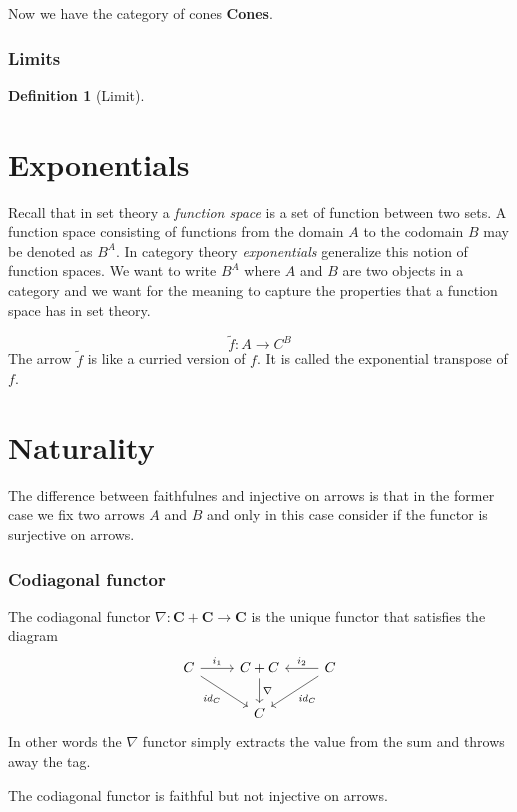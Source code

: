 \documentclass{book}
\theoremstyle{definition}
\newtheorem{definition}{Definition}[section]
\newcommand\id{\mathit{id}}
\begin{document}
Now we have the category of cones \textbf{Cones}.

\subsection{Limits}

\begin{definition}[Limit]
\end{definition}

\chapter{Exponentials}

Recall that in set theory a \emph{function space} is a set of function between
two sets. A function space consisting of functions from the domain $A$ to the
codomain $B$ may be denoted as $B^{A}$. In category theory \emph{exponentials}
generalize this notion of function spaces. We want to write $B^{A}$ where $A$
and $B$ are two objects in a category and we want for the meaning to capture the
properties that a function space has in set theory.

\[
  \tilde{f} : A \to C^{B}
\]
The arrow $\tilde{f}$ is like a curried version of $f$. It is called the
exponential transpose of $f$.

\chapter{Naturality}

The difference between faithfulnes and injective on arrows is that in the former
case we fix two arrows $A$ and $B$ and only in this case consider if the functor
is surjective on arrows.

\subsection{Codiagonal functor}

The codiagonal functor $\nabla : \mathbf{C} + \mathbf{C} \to \mathbf{C}$ is the unique
functor that satisfies the diagram
\[
  \begin{tikzcd}
    C \ar[r, "i_{1}"] \ar[dr, "\id_{C}"'] & C + C \ar[d, "\nabla"] & C \ar[l, "i_{2}"'] \ar[dl, "\id_{C}"] \\
    & C
  \end{tikzcd}
\]
In other words the $\nabla$ functor simply extracts the value from the sum and throws
away the tag.

The codiagonal functor is faithful but not injective on arrows.
\end{document}
